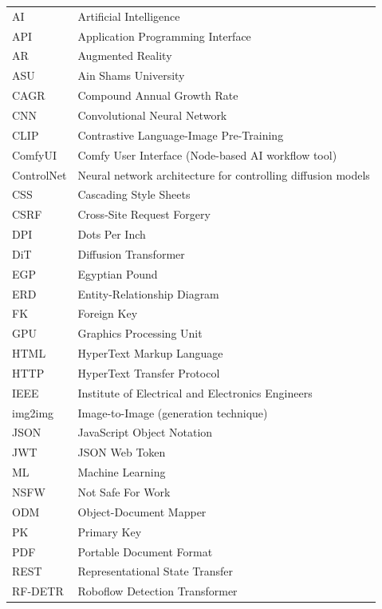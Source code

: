 \begin{longtable}{p{3cm} p{10cm}}
    AI & Artificial Intelligence \\[0.3cm]
    API & Application Programming Interface \\[0.3cm]
    AR & Augmented Reality \\[0.3cm]
    ASU & Ain Shams University \\[0.3cm]
    CAGR & Compound Annual Growth Rate \\[0.3cm]
    CNN & Convolutional Neural Network \\[0.3cm]
    CLIP & Contrastive Language-Image Pre-Training \\[0.3cm]
    ComfyUI & Comfy User Interface (Node-based AI workflow tool) \\[0.3cm]
    ControlNet & Neural network architecture for controlling diffusion models \\[0.3cm]
    CSS & Cascading Style Sheets \\[0.3cm]
    CSRF & Cross-Site Request Forgery \\[0.3cm]
    DPI & Dots Per Inch \\[0.3cm]
    DiT & Diffusion Transformer \\[0.3cm]
    EGP & Egyptian Pound \\[0.3cm]
    ERD & Entity-Relationship Diagram \\[0.3cm]
    FK & Foreign Key \\[0.3cm]
    GPU & Graphics Processing Unit \\[0.3cm]
    HTML & HyperText Markup Language \\[0.3cm]
    HTTP & HyperText Transfer Protocol \\[0.3cm]
    IEEE & Institute of Electrical and Electronics Engineers \\[0.3cm]
    img2img & Image-to-Image (generation technique) \\[0.3cm]
    JSON & JavaScript Object Notation \\[0.3cm]
    JWT & JSON Web Token \\[0.3cm]
    ML & Machine Learning \\[0.3cm]
    NSFW & Not Safe For Work \\[0.3cm]
    ODM & Object-Document Mapper \\[0.3cm]
    PK & Primary Key \\[0.3cm]
    PDF & Portable Document Format \\[0.3cm]
    REST & Representational State Transfer \\[0.3cm]
    RF-DETR & Roboflow Detection Transformer \\[0.3cm]

\end{longtable}
